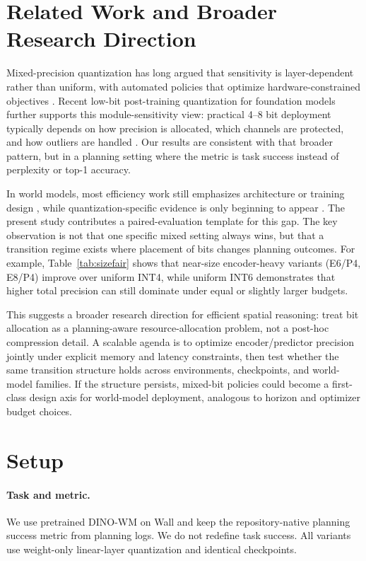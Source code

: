 \documentclass{article}
\begin{document}
\section{Related Work and Broader Research Direction}
Mixed-precision quantization has long argued that sensitivity is layer-dependent rather than uniform, with automated policies that optimize hardware-constrained objectives \citep{wang2018haq,dong2019hawqv2}.
Recent low-bit post-training quantization for foundation models further supports this module-sensitivity view: practical 4--8 bit deployment typically depends on how precision is allocated, which channels are protected, and how outliers are handled \citep{dettmers2022llmint8,frantar2022gptq,xiao2022smoothquant,lin2023awq}.
Our results are consistent with that broader pattern, but in a planning setting where the metric is task success instead of perplexity or top-1 accuracy.

In world models, most efficiency work still emphasizes architecture or training design \citep{ha2018worldmodels,hafner2018planet,hafner2019dreamer,hafner2023dreamerv3}, while quantization-specific evidence is only beginning to appear \citep{fu2026quantwm,liu2025lowbitmodelquantizationdeep}.
The present study contributes a paired-evaluation template for this gap.
The key observation is not that one specific mixed setting always wins, but that a transition regime exists where placement of bits changes planning outcomes.
For example, Table~\ref{tab:sizefair} shows that near-size encoder-heavy variants (E6/P4, E8/P4) improve over uniform INT4, while uniform INT6 demonstrates that higher total precision can still dominate under equal or slightly larger budgets.

This suggests a broader research direction for efficient spatial reasoning: treat bit allocation as a planning-aware resource-allocation problem, not a post-hoc compression detail.
A scalable agenda is to optimize encoder/predictor precision jointly under explicit memory and latency constraints, then test whether the same transition structure holds across environments, checkpoints, and world-model families.
If the structure persists, mixed-bit policies could become a first-class design axis for world-model deployment, analogous to horizon and optimizer budget choices.

\section{Setup}
\paragraph{Task and metric.}
We use pretrained DINO-WM \citep{zhou2024dinowm} on Wall and keep the repository-native planning success metric from planning logs.
We do not redefine task success.
All variants use weight-only linear-layer quantization and identical checkpoints.
\end{document}
